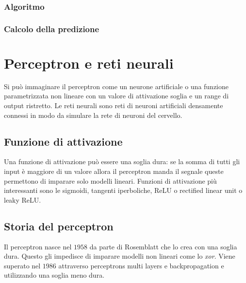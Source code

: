 		\subsubsection{Algoritmo}
		

		\subsubsection{Calcolo della predizione}
		

\section{Perceptron e reti neurali}
Si pu\`o immaginare il perceptron come un neurone artificiale o una funzione parametrizzata non lineare con un valore di attivazione soglia e un range di output ristretto.
Le reti neurali sono reti di neuroni artificiali densamente connessi in modo da simulare la rete di neuroni del cervello.

	\subsection{Funzione di attivazione}
	Una funzione di attivazione pu\`o essere una soglia dura: se la somma di tutti gli input \`e maggiore di un valore allora il perceptron manda il segnale queste permettono di imparare solo modelli lineari.
	Funzioni di attivazione pi\`u interessanti sono le sigmoidi, tangenti iperboliche, ReLU o rectified linear unit o leaky ReLU.

	\subsection{Storia del perceptron}
	Il perceptron nasce nel $1958$ da parte di Rosemblatt che lo crea con una soglia dura.
	Questo gli impedisce di imparare modelli non lineari come lo \emph{xor}.
	Viene superato nel $1986$ attraverso perceptrons multi layers e backpropagation e utilizzando una soglia meno dura.
